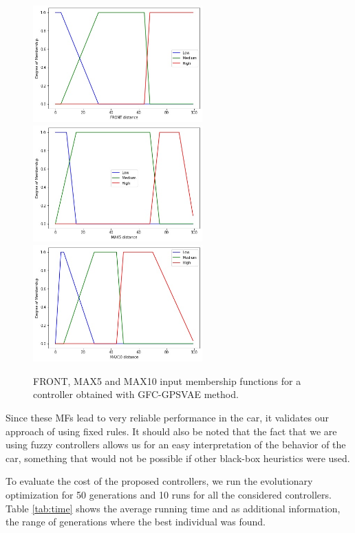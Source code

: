 \documentclass[10pt,journal,compsoc]{IEEEtran}
\begin{document}
%
\begin{figure}[h]	
  \begin{center}
    \includegraphics[width=6.5cm, height=2.5 cm]{fig/FRONT}
    \includegraphics[width=6.5cm, height=2.5 cm]{fig/MAX5}
    \includegraphics[width=6.5cm, height=2.5 cm]{fig/MAX10}		
    \caption{FRONT, MAX5 and MAX10 input membership functions for a controller obtained with {\sf GFC-GPSVAE} method.}
    \label{fig:frontmfs}
\end{center}	
\end{figure}

Since these MFs lead to very reliable performance in the car, it
validates our approach of using fixed rules. It should
also be noted that the fact that we are using fuzzy controllers allows
us for an easy interpretation of the behavior of the car, something
that would not be possible if other black-box heuristics were used.


To evaluate the cost of the proposed controllers, we run the evolutionary optimization for 50 generations and 10 runs for all the considered controllers.
 Table \ref{tab:time} shows the average running time and  as additional information, the range of generations where the best individual was found.
\end{document}
